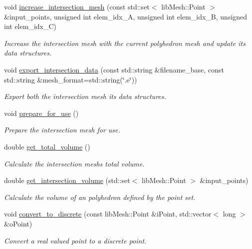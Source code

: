 \begin{DoxyCompactItemize}
void \hyperlink{classcarl_1_1_mesh___intersection_a154a8076123b209a1bddc210c913006f}{increase\+\_\+intersection\+\_\+mesh} (const std\+::set$<$ lib\+Mesh\+::\+Point $>$ \&input\+\_\+points, unsigned int elem\+\_\+idx\+\_\+\+A, unsigned int elem\+\_\+idx\+\_\+\+B, unsigned int elem\+\_\+idx\+\_\+\+C)
\begin{DoxyCompactList}\small\item\em Increase the intersection mesh with the current polyhedron mesh and update its data structures. \end{DoxyCompactList}\item 
void \hyperlink{classcarl_1_1_mesh___intersection_a40d4cca8c4ec73a2576322db063bbefb}{export\+\_\+intersection\+\_\+data} (const std\+::string \&filename\+\_\+base, const std\+::string \&mesh\+\_\+format=std\+::string(\char`\"{}.e\char`\"{}))
\begin{DoxyCompactList}\small\item\em Export both the intersection mesh its data structures. \end{DoxyCompactList}\item 
void \hyperlink{classcarl_1_1_mesh___intersection_a5078651b6ae4cfdf97e43dfa172094b6}{prepare\+\_\+for\+\_\+use} ()
\begin{DoxyCompactList}\small\item\em Prepare the intersection mesh for use. \end{DoxyCompactList}\item 
double \hyperlink{classcarl_1_1_mesh___intersection_a67f126ec639724230b32916b59af4933}{get\+\_\+total\+\_\+volume} ()
\begin{DoxyCompactList}\small\item\em Calculate the intersection mesh\textquotesingle{}s total volume. \end{DoxyCompactList}\item 
double \hyperlink{classcarl_1_1_mesh___intersection_aed1744e821dbfa900d035c44036d0fdf}{get\+\_\+intersection\+\_\+volume} (std\+::set$<$ lib\+Mesh\+::\+Point $>$ \&input\+\_\+points)
\begin{DoxyCompactList}\small\item\em Calculate the volume of an polyhedron defined by the point set. \end{DoxyCompactList}\item 
void \hyperlink{classcarl_1_1_mesh___intersection_a9295162aa24e62dae37d3dd12c46f0d1}{convert\+\_\+to\+\_\+discrete} (const lib\+Mesh\+::\+Point \&i\+Point, std\+::vector$<$ long $>$ \&o\+Point)
\begin{DoxyCompactList}\small\item\em Convert a real valued point to a discrete point. \end{DoxyCompactList}\end{DoxyCompactItemize}
